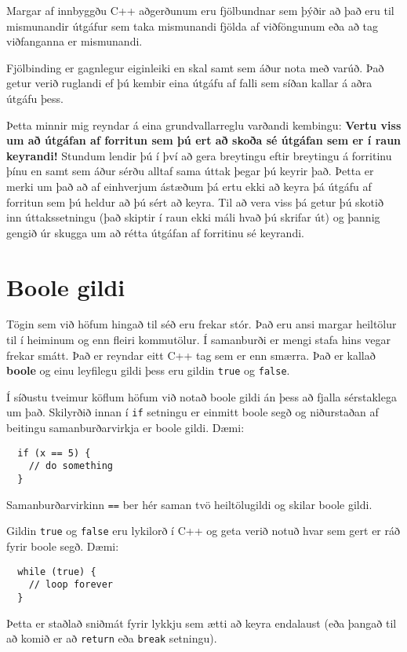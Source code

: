 Margar af innbyggðu C++ aðgerðunum eru fjölbundnar sem þýðir að það eru til mismunandir útgáfur sem taka mismunandi fjölda af viðföngunum eða að tag viðfanganna er mismunandi.

Fjölbinding er gagnlegur eiginleiki en skal samt sem áður nota með varúð.
Það getur verið ruglandi ef þú kembir eina útgáfu af falli sem síðan kallar á aðra útgáfu þess.

Þetta minnir mig reyndar á eina grundvallarreglu varðandi kembingu:
{\bf Vertu viss um að útgáfan af forritun sem þú ert að skoða sé útgáfan sem er í raun keyrandi!}
Stundum lendir þú í því að gera breytingu eftir breytingu á forritinu þínu en samt sem áður sérðu alltaf sama úttak þegar þú keyrir það.
Þetta er merki um það að af einhverjum ástæðum þá ertu ekki að keyra þá útgáfu af forritun sem þú heldur að þú sért að keyra.
Til að vera viss þá getur þú skotið inn úttakssetningu (það skiptir í raun ekki máli hvað þú skrifar út) og þannig gengið úr skugga um að rétta útgáfan af forritinu sé keyrandi.

\section{Boole gildi}

Tögin sem við höfum hingað til séð eru frekar stór.
Það eru ansi margar heiltölur til í heiminum og enn fleiri kommutölur.
Í samanburði er mengi stafa hins vegar frekar smátt.
Það er reyndar eitt C++ tag sem er enn smærra.
Það er kallað {\bf boole} og einu leyfilegu gildi þess eru gildin {\tt true} og {\tt false}.

Í síðustu tveimur köflum höfum við notað boole gildi án þess að fjalla sérstaklega um það.
Skilyrðið innan í {\tt if} setningu er einmitt boole segð og niðurstaðan af beitingu samanburðarvirkja er boole gildi.
Dæmi:

\begin{verbatim}
  if (x == 5) {
    // do something
  }
\end{verbatim}
%
Samanburðarvirkinn {\tt ==} ber hér saman tvö heiltölugildi og skilar boole gildi.


Gildin {\tt true} og {\tt false} eru lykilorð í C++ 
og geta verið notuð hvar sem gert er ráð fyrir boole segð.
Dæmi:  

\begin{verbatim}
  while (true) {
    // loop forever
  }
\end{verbatim}
%
Þetta er staðlað sniðmát fyrir lykkju sem ætti að keyra endalaust (eða þangað til að komið er að {\tt return} eða {\tt break} setningu).

